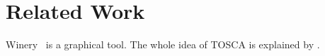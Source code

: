 \section{Related Work}
\label{sec:relatedwork}

Winery~\cite{Winery} is a graphical  tool.
The whole idea of TOSCA is explained by \citet{Binz2009}.
